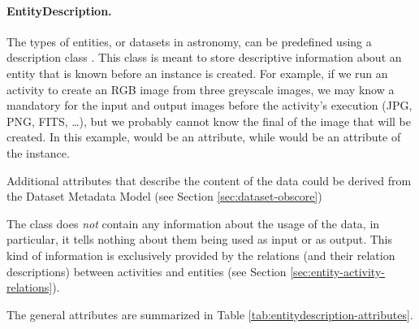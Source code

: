 \paragraph{EntityDescription.}
The types of entities, or datasets in astronomy, can be predefined using a
description class . This class is meant to store
descriptive information %
about an entity that is known before an  instance is created.
For example, if we run an activity to create an RGB image from three greyscale
images, we may know a mandatory  for the input and output
images before the activity's execution (JPG, PNG, FITS, \ldots), but we probably
cannot know the final  of the image  that will be created.
In this example,  would be an  attribute,
while  would be an attribute of the  instance. 

Additional attributes that describe the content of the data could be derived from 
the Dataset Metadata Model (see Section \ref{sec:dataset-obscore})

The  class does \emph{not} contain any information about the
usage of the data, in particular, it tells nothing about them being used as
input or as output. This kind of information is exclusively provided by the
relations (and their relation descriptions) between activities and entities
(see Section \ref{sec:entity-activity-relations}).

The  general attributes are summarized in Table 
\ref{tab:entitydescription-attributes}.



